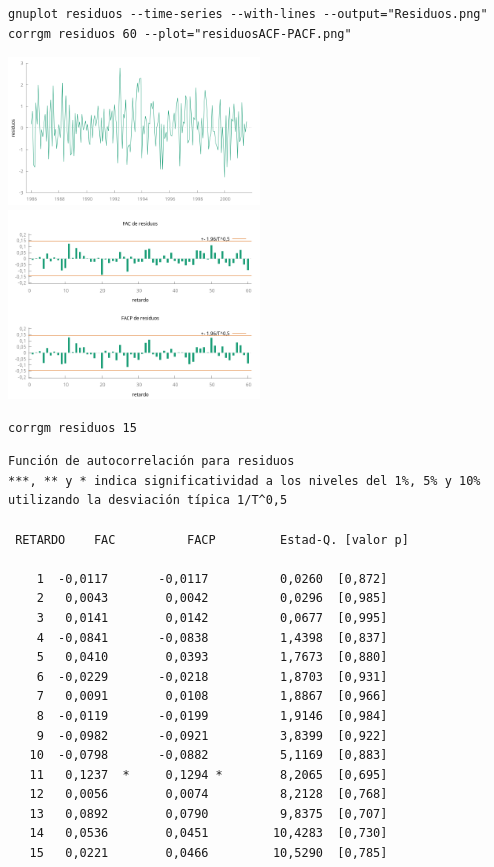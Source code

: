 \documentclass[10pt]{article}
\begin{document}
\begin{verbatim}
gnuplot residuos --time-series --with-lines --output="Residuos.png"
corrgm residuos 60 --plot="residuosACF-PACF.png"
\end{verbatim}

\begin{center}
\includegraphics[width=0.5\textwidth]{./SegundoEjercicioIdentificacionARIMA/Residuos.png}
\includegraphics[width=0.5\textwidth]{./SegundoEjercicioIdentificacionARIMA/residuosACF-PACF.png}
\end{center}

\begin{verbatim}
corrgm residuos 15
\end{verbatim}


\begin{verbatim}
Función de autocorrelación para residuos
***, ** y * indica significatividad a los niveles del 1%, 5% y 10%
utilizando la desviación típica 1/T^0,5

 RETARDO    FAC          FACP         Estad-Q. [valor p]

    1  -0,0117       -0,0117          0,0260  [0,872]
    2   0,0043        0,0042          0,0296  [0,985]
    3   0,0141        0,0142          0,0677  [0,995]
    4  -0,0841       -0,0838          1,4398  [0,837]
    5   0,0410        0,0393          1,7673  [0,880]
    6  -0,0229       -0,0218          1,8703  [0,931]
    7   0,0091        0,0108          1,8867  [0,966]
    8  -0,0119       -0,0199          1,9146  [0,984]
    9  -0,0982       -0,0921          3,8399  [0,922]
   10  -0,0798       -0,0882          5,1169  [0,883]
   11   0,1237  *     0,1294 *        8,2065  [0,695]
   12   0,0056        0,0074          8,2128  [0,768]
   13   0,0892        0,0790          9,8375  [0,707]
   14   0,0536        0,0451         10,4283  [0,730]
   15   0,0221        0,0466         10,5290  [0,785]
\end{verbatim}
\end{document}

